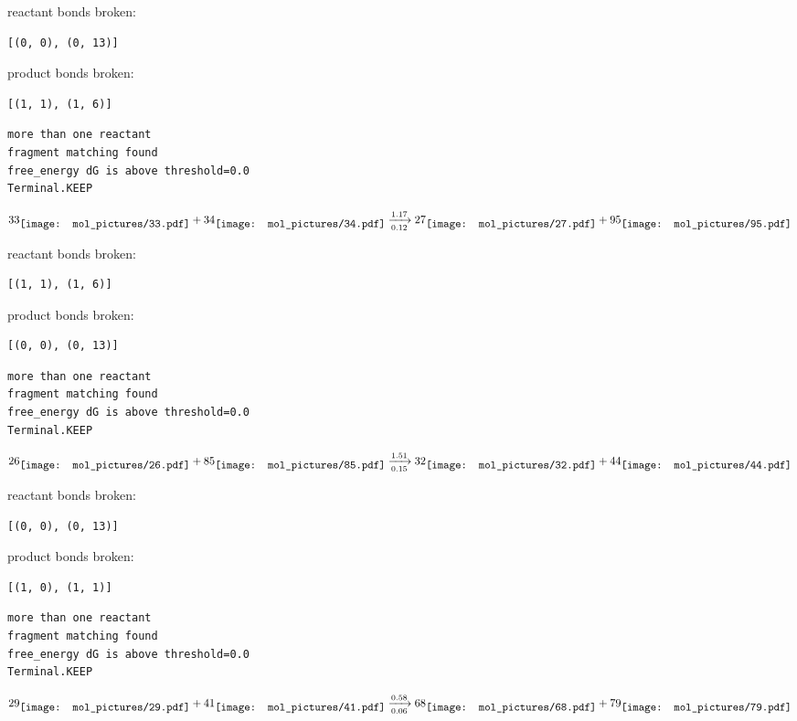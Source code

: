 \documentclass{article}
\begin{document}
reactant bonds broken:\begin{verbatim}
[(0, 0), (0, 13)]
\end{verbatim}
product bonds broken:\begin{verbatim}
[(1, 1), (1, 6)]
\end{verbatim}




\vspace{1cm}
\begin{verbatim}
more than one reactant
fragment matching found
free_energy dG is above threshold=0.0
Terminal.KEEP
\end{verbatim}
$$
33
\raisebox{-.5\height}{\texttt{[image: mol\_pictures/33.pdf]}}
+
34
\raisebox{-.5\height}{\texttt{[image: mol\_pictures/34.pdf]}}
\xrightarrow[0.12]{1.17}
27
\raisebox{-.5\height}{\texttt{[image: mol\_pictures/27.pdf]}}
+
95
\raisebox{-.5\height}{\texttt{[image: mol\_pictures/95.pdf]}}
$$


reactant bonds broken:\begin{verbatim}
[(1, 1), (1, 6)]
\end{verbatim}
product bonds broken:\begin{verbatim}
[(0, 0), (0, 13)]
\end{verbatim}




\vspace{1cm}
\begin{verbatim}
more than one reactant
fragment matching found
free_energy dG is above threshold=0.0
Terminal.KEEP
\end{verbatim}
$$
26
\raisebox{-.5\height}{\texttt{[image: mol\_pictures/26.pdf]}}
+
85
\raisebox{-.5\height}{\texttt{[image: mol\_pictures/85.pdf]}}
\xrightarrow[0.15]{1.51}
32
\raisebox{-.5\height}{\texttt{[image: mol\_pictures/32.pdf]}}
+
44
\raisebox{-.5\height}{\texttt{[image: mol\_pictures/44.pdf]}}
$$


reactant bonds broken:\begin{verbatim}
[(0, 0), (0, 13)]
\end{verbatim}
product bonds broken:\begin{verbatim}
[(1, 0), (1, 1)]
\end{verbatim}




\vspace{1cm}
\begin{verbatim}
more than one reactant
fragment matching found
free_energy dG is above threshold=0.0
Terminal.KEEP
\end{verbatim}
$$
29
\raisebox{-.5\height}{\texttt{[image: mol\_pictures/29.pdf]}}
+
41
\raisebox{-.5\height}{\texttt{[image: mol\_pictures/41.pdf]}}
\xrightarrow[0.06]{0.58}
68
\raisebox{-.5\height}{\texttt{[image: mol\_pictures/68.pdf]}}
+
79
\raisebox{-.5\height}{\texttt{[image: mol\_pictures/79.pdf]}}
$$
\end{document}
